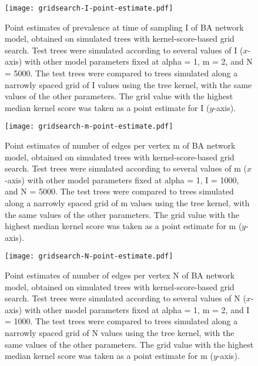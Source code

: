 \begin{figure}[ht]
  \centering
  \texttt{[image: gridsearch-I-point-estimate.pdf]}
  \caption[ Point estimates of prevalence at time of sampling \gls{I} of
      \acrlong{BA} network model, obtained on simulated trees with
      kernel-score-based grid search. ]
  {
      Point estimates of prevalence at time of sampling \gls{I} of \acrlong{BA}
      network model, obtained on simulated trees with kernel-score-based grid
      search. Test trees were simulated according to several values of \gls{I}
      ($x$-axis) with other model parameters fixed at \gls{alpha} = 1, \gls{m}
      = 2, and \gls{N} = 5000. The test trees were compared to trees simulated
      along a narrowly spaced grid of \gls{I} values using the tree kernel,
      with the same values of the other parameters. The grid value with the
      highest median kernel score was taken as a point estimate for \gls{I}
      ($y$-axis).
  }
  \label{fig:gridptI}
\end{figure}

\begin{figure}[ht]
  \centering
  \texttt{[image: gridsearch-m-point-estimate.pdf]}
  \caption[
      Point estimates of number of edges per vertex \gls{m} of \acrlong{BA}
      network model, obtained on simulated trees with kernel-score-based grid
      search.
  ]
  {
      Point estimates of number of edges per vertex \gls{m} of \acrlong{BA}
      network model, obtained on simulated trees with kernel-score-based grid
      search. Test trees were simulated according to several values of \gls{m}
      ($x$-axis) with other model parameters fixed at \gls{alpha} = 1, \gls{I}
      = 1000, and \gls{N} = 5000. The test trees were compared to trees
      simulated along a narrowly spaced grid of \gls{m} values using the tree
      kernel, with the same values of the other parameters. The grid value with
      the highest median kernel score was taken as a point estimate for \gls{m}
      ($y$-axis).
  }
  \label{fig:gridptm}
\end{figure}

\begin{figure}[ht]
  \centering
  \texttt{[image: gridsearch-N-point-estimate.pdf]}
  \caption[
      Point estimates of number of edges per vertex \gls{N} of \acrlong{BA}
      network model, obtained on simulated trees with kernel-score-based grid
      search.
  ]{
      Point estimates of number of edges per vertex \gls{N} of \acrlong{BA}
      network model, obtained on simulated trees with kernel-score-based grid
      search. Test trees were simulated according to several values of \gls{N}
      ($x$-axis) with other model parameters fixed at \gls{alpha} = 1, \gls{m}
      = 2, and \gls{I} = 1000. The test trees were compared to trees simulated
      along a narrowly spaced grid of \gls{N} values using the tree kernel,
      with the same values of the other parameters. The grid value with the
      highest median kernel score was taken as a point estimate for \gls{m}
      ($y$-axis).
  }
  \label{fig:gridptN}
\end{figure}

